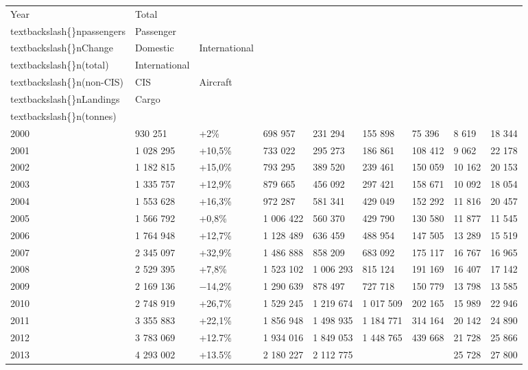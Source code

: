 \documentclass{article}
\begin{document}
\begin{tabular}{lllllllll}
\toprule
Year & Total\\textbackslash\{\}npassengers & Passenger\\textbackslash\{\}nChange & Domestic & International\\textbackslash\{\}n(total) & International\\textbackslash\{\}n(non-CIS) & CIS & Aircraft\\textbackslash\{\}nLandings & Cargo\\textbackslash\{\}n(tonnes) \\
\midrule
2000 & 930 251 & +2\% & 698 957 & 231 294 & 155 898 & 75 396 & 8 619 & 18 344 \\
2001 & 1 028 295 & +10,5\% & 733 022 & 295 273 & 186 861 & 108 412 & 9 062 & 22 178 \\
2002 & 1 182 815 & +15,0\% & 793 295 & 389 520 & 239 461 & 150 059 & 10 162 & 20 153 \\
2003 & 1 335 757 & +12,9\% & 879 665 & 456 092 & 297 421 & 158 671 & 10 092 & 18 054 \\
2004 & 1 553 628 & +16,3\% & 972 287 & 581 341 & 429 049 & 152 292 & 11 816 & 20 457 \\
2005 & 1 566 792 & +0,8\% & 1 006 422 & 560 370 & 429 790 & 130 580 & 11 877 & 11 545 \\
2006 & 1 764 948 & +12,7\% & 1 128 489 & 636 459 & 488 954 & 147 505 & 13 289 & 15 519 \\
2007 & 2 345 097 & +32,9\% & 1 486 888 & 858 209 & 683 092 & 175 117 & 16 767 & 16 965 \\
2008 & 2 529 395 & +7,8\% & 1 523 102 & 1 006 293 & 815 124 & 191 169 & 16 407 & 17 142 \\
2009 & 2 169 136 & −14,2\% & 1 290 639 & 878 497 & 727 718 & 150 779 & 13 798 & 13 585 \\
2010 & 2 748 919 & +26,7\% & 1 529 245 & 1 219 674 & 1 017 509 & 202 165 & 15 989 & 22 946 \\
2011 & 3 355 883 & +22,1\% & 1 856 948 & 1 498 935 & 1 184 771 & 314 164 & 20 142 & 24 890 \\
2012 & 3 783 069 & +12.7\% & 1 934 016 & 1 849 053 & 1 448 765 & 439 668 & 21 728 & 25 866 \\
2013 & 4 293 002 & +13.5\% & 2 180 227 & 2 112 775 &  &  & 25 728 & 27 800 \\
\bottomrule
\end{tabular}
\end{document}
